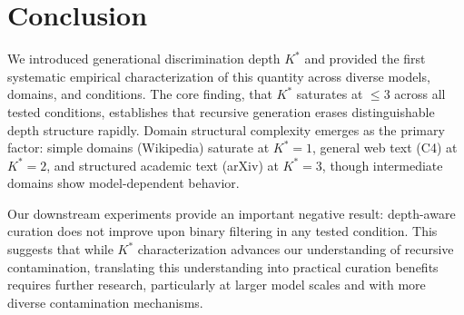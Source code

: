 \documentclass[11pt]{article}
\newcommand{\kstar}{K^*}
\begin{document}
\section{Conclusion}

We introduced generational discrimination depth $\kstar$ and provided the first systematic empirical characterization of this quantity across diverse models, domains, and conditions.
The core finding, that $\kstar$ saturates at $\leq 3$ across all tested conditions, establishes that recursive generation erases distinguishable depth structure rapidly.
Domain structural complexity emerges as the primary factor: simple domains (Wikipedia) saturate at $\kstar{=}1$, general web text (C4) at $\kstar{=}2$, and structured academic text (arXiv) at $\kstar{=}3$, though intermediate domains show model-dependent behavior.

Our downstream experiments provide an important negative result: depth-aware curation does not improve upon binary filtering in any tested condition.
This suggests that while $\kstar$ characterization advances our understanding of recursive contamination, translating this understanding into practical curation benefits requires further research, particularly at larger model scales and with more diverse contamination mechanisms.



\end{document}
